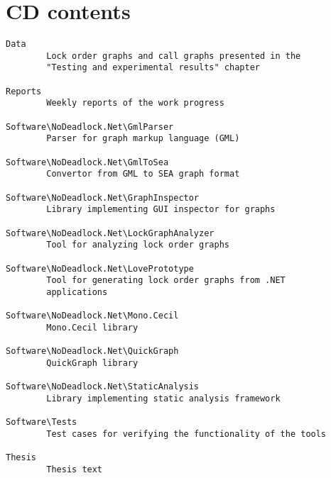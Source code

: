 \appendix
\chapter{CD contents}

\begin{lstlisting}
Data
		Lock order graphs and call graphs presented in the
		"Testing and experimental results" chapter

Reports
		Weekly reports of the work progress

Software\NoDeadlock.Net\GmlParser
		Parser for graph markup language (GML)

Software\NoDeadlock.Net\GmlToSea
		Convertor from GML to SEA graph format

Software\NoDeadlock.Net\GraphInspector
		Library implementing GUI inspector for graphs 

Software\NoDeadlock.Net\LockGraphAnalyzer
		Tool for analyzing lock order graphs

Software\NoDeadlock.Net\LovePrototype
		Tool for generating lock order graphs from .NET
		applications

Software\NoDeadlock.Net\Mono.Cecil
		Mono.Cecil library

Software\NoDeadlock.Net\QuickGraph
		QuickGraph library

Software\NoDeadlock.Net\StaticAnalysis
		Library implementing static analysis framework

Software\Tests
		Test cases for verifying the functionality of the tools

Thesis
		Thesis text
\end{lstlisting}

